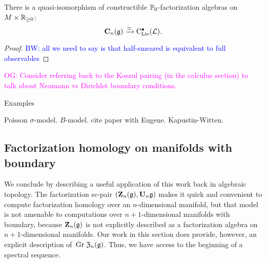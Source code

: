 \documentclass[11pt]{amsart}
\numberwithin{equation}{section}
\def\brian{\textcolor{blue}{BW: }\textcolor{blue}}
\def\owen{\textcolor{magenta}{OG: }\textcolor{magenta}}
\begin{document}
\begin{prp}
There is a quasi-isomorphism of constructible $\mathbb P_0$-factorization algebras on $M \times \mathbb R_{\geq 0}$:
\[
\mathbf C_n (\mathfrak g) \xrightarrow{\simeq} {\rm C}_{\rm Lie}^\bullet(\mathcal L) .
\]
\end{prp}

\begin{proof}
\brian{all we need to say is that half-smeared is equivalent to full observables}

\end{proof}

\owen{Consider referring back to the Koszul pairing (in the calculus section) to talk about Neumann vs Dirichlet boundary conditions.}


\begin{rmk} Examples

Poisson $\sigma$-model. 
$B$-model. 
cite paper with Eugene.
Kapustin-Witten. 
\end{rmk}

\subsection{Factorization homology on manifolds with boundary}

We conclude by describing a useful application of this work back in algebraic topology.
The factorization sc-pair $(\mathbf Z_n(\mathfrak g), \mathbf U_n \mathfrak g)$ makes it quick and convenient to compute factorization homology over an $n$-dimensional manifold,
but that model is not amenable to computations over $n+1$-dimensional manifolds with boundary,
because $\mathbf Z_n(\mathfrak g)$ is not explicitly described as a factorization algebra on $n+1$-dimensional manifolds.
Our work in this section does provide, however, an explicit description of~${\rm Gr}\; {\frak Z}_n(\mathfrak g)$. 
Thus, we have access to the beginning of a spectral sequence.
\end{document}
